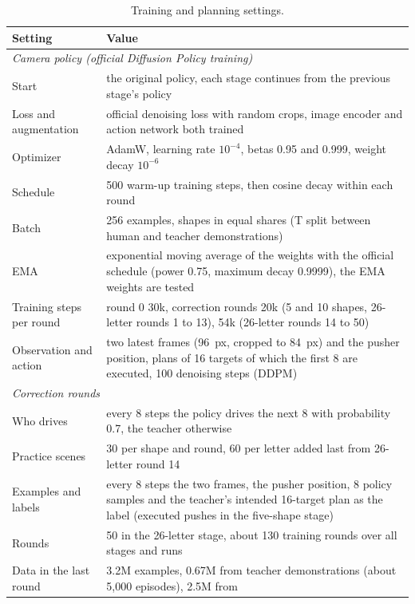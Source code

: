 \documentclass[10pt,twocolumn,letterpaper]{article}
\begin{document}
\begin{table}[!htbp]
  \centering\small
  \caption{Training and planning settings.}
  \label{tab:hyper}
  \begin{tabular}{p{4.2cm}p{12.6cm}}
    \toprule
    Setting & Value \\
    \midrule
    \multicolumn{2}{l}{\textit{Camera policy (official Diffusion Policy training)}} \\
    Start & the original policy, each stage continues from the previous stage's policy \\
    Loss and augmentation & official denoising loss with random crops, image encoder and action network both trained \\
    Optimizer & AdamW, learning rate $10^{-4}$, betas 0.95 and 0.999, weight decay $10^{-6}$ \\
    Schedule & 500 warm-up training steps, then cosine decay within each round \\
    Batch & 256 examples, shapes in equal shares (T split between human and teacher demonstrations) \\
    EMA & exponential moving average of the weights with the official schedule (power 0.75, maximum decay 0.9999),
      the EMA weights are tested \\
    Training steps per round & round 0 30k, correction rounds 20k (5 and 10 shapes, 26-letter rounds 1 to 13), 54k
      (26-letter rounds 14 to 50) \\
    Observation and action & two latest frames (96~px, cropped to 84~px) and the pusher position, plans of 16 targets
      of which the first 8 are executed, 100 denoising steps (DDPM) \\
    \midrule
    \multicolumn{2}{l}{\textit{Correction rounds}} \\
    Who drives & every 8 steps the policy drives the next 8 with probability 0.7, the teacher otherwise \\
    Practice scenes & 30 per shape and round, 60 per letter added last from 26-letter round 14 \\
    Examples and labels & every 8 steps the two frames, the pusher position, 8 policy samples and the teacher's
      intended 16-target plan as the label (executed pushes in the five-shape stage) \\
    Rounds & 50 in the 26-letter stage, about 130 training rounds over all stages and runs \\
    Data in the last round & 3.2M examples, 0.67M from teacher demonstrations (about 5,000 episodes), 2.5M from

\end{tabular}
\end{table}
\end{document}
